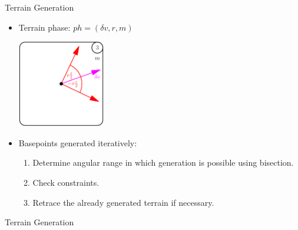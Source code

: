 \begin{frame}{Terrain Generation}
    \begin{itemize}
        \item<1-> Terrain phase: $ph = (\delta v, r, m)$\\
        \begin{center}
            \includegraphics[width=0.3\textwidth]{../figures/terrain/generation/terrainPhase.pdf}\\
        \end{center}
        \item<2-> Basepoints generated iteratively:
        \begin{enumerate}
            \item Determine angular range in which generation is possible using bisection.
            \item Check constraints.
            \item Retrace the already generated terrain if necessary.
        \end{enumerate}
    \end{itemize}
\end{frame}

\begin{frame}{Terrain Generation}
    \vspace{-.4cm}
\end{frame}